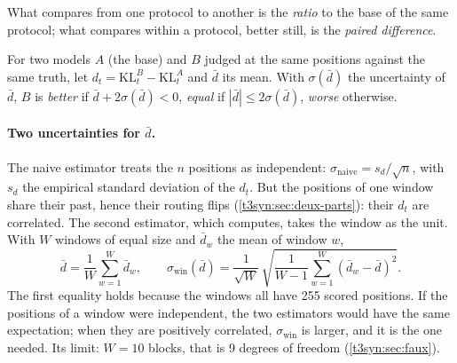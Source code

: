 What compares from one protocol to another is the \emph{ratio} to the base of the same protocol; what compares within a protocol, better still, is the \emph{paired difference}.

\begin{definition}\label{t3syn:def:regle}
For two models $A$ (the base) and $B$ judged at the same positions against the same truth, let $d_t = \mathrm{KL}^B_t - \mathrm{KL}^A_t$ and $\bar d$ its mean. With $\sigma(\bar d)$ the uncertainty of $\bar d$, $B$ is \emph{better} if $\bar d + 2\sigma(\bar d) < 0$, \emph{equal} if $|\bar d| \le 2\sigma(\bar d)$, \emph{worse} otherwise.
\end{definition}

\paragraph{Two uncertainties for $\bar d$.} The naive estimator treats the $n$ positions as independent: $\sigma_{\text{naive}} = s_d/\sqrt n$, with $s_d$ the empirical standard deviation of the $d_t$. But the positions of one window share their past, hence their routing flips (\cref{t3syn:sec:deux-parts}): their $d_t$ are correlated. The second estimator, which  computes, takes the window as the unit. With $W$ windows of equal size and $\bar d_w$ the mean of window $w$,
\begin{equation}\label{t3syn:eq:blocs}
\bar d = \frac1W \sum_{w=1}^{W} \bar d_w, \qquad
\sigma_{\text{win}}(\bar d) = \frac{1}{\sqrt W}\,\sqrt{\frac{1}{W-1}\sum_{w=1}^{W} (\bar d_w - \bar d)^2}.
\end{equation}
The first equality holds because the windows all have 255 scored positions. If the positions of a window were independent, the two estimators would have the same expectation; when they are positively correlated, $\sigma_{\text{win}}$ is larger, and it is the one needed. Its limit: $W = 10$ blocks, that is 9 degrees of freedom (\cref{t3syn:sec:faux}).


